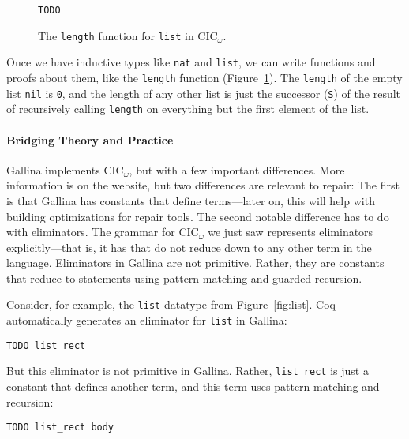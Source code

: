 \begin{figure}
\begin{lstlisting}
TODO
\end{lstlisting}
\caption{The \lstinline{length} function for \lstinline{list} in CIC$_{\omega}$.}
\label{fig:length-theory}
\end{figure}

Once we have inductive types like \lstinline{nat} and \lstinline{list}, we can write functions and proofs about them, like the \lstinline{length} function (Figure~\ref{fig:length-theory}).
The \lstinline{length} of the empty list \lstinline{nil} is \lstinline{0}, and the length of any other list
is just the successor (\lstinline{S}) of the result of recursively calling \lstinline{length} on everything but the first element of the list.

\paragraph{Bridging Theory and Practice}

Gallina implements CIC$_{\omega}$, but with a few important differences.
More information is on the website, %
but two differences are relevant to repair:
The first is that Gallina has constants that define terms---later on, this will help with building optimizations for repair tools.
The second notable difference has to do with eliminators.
The grammar for CIC$_{\omega}$ we just saw represents eliminators explicitly---that is, it has  that do
not reduce down to any other term in the language.
Eliminators in Gallina are not primitive.
Rather, they are constants that reduce to statements using pattern matching and guarded recursion.

Consider, for example, the \lstinline{list} datatype from Figure~\ref{fig:list}.
Coq automatically generates an eliminator for \lstinline{list} in Gallina:

\begin{lstlisting}
TODO list_rect
\end{lstlisting}
But this eliminator is not primitive in Gallina.
Rather, \lstinline{list_rect} is just a constant that defines another term,
and this term uses pattern matching and recursion:

\begin{lstlisting}
TODO list_rect body
\end{lstlisting}

